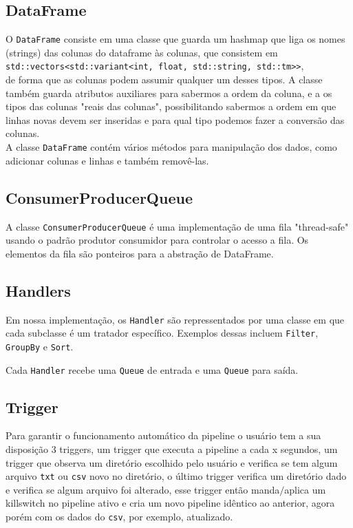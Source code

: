 \documentclass[12pt,a4paper]{article}
\begin{document}
\subsection*{DataFrame}
O \verb|DataFrame| consiste em uma classe que guarda um hashmap que liga os nomes (strings) das colunas do dataframe às colunas, que consistem em \\\texttt{std::vectors<std::variant<int, float, std::string, std::tm>>},\\
de forma que as colunas podem assumir qualquer um desses tipos. A classe também guarda atributos auxiliares para sabermos a ordem da coluna, e a os tipos das colunas "reais das colunas", possibilitando sabermos a ordem em que linhas novas devem ser inseridas e para qual tipo podemos fazer a conversão das colunas.\\
A classe \verb|DataFrame| contém vários métodos para manipulação dos dados, como adicionar colunas e linhas e também removê-las.
\subsection*{ConsumerProducerQueue}
A classe \verb|ConsumerProducerQueue| é uma implementação de uma fila "thread-safe" usando o padrão produtor consumidor para controlar o acesso a fila. Os elementos da fila são ponteiros para a abstração de DataFrame.
\subsection*{Handlers}
Em nossa implementação, os \verb|Handler| são repressentados por uma classe em que cada subclasse é um tratador específico. Exemplos dessas incluem \verb|Filter|, \verb|GroupBy| e \verb|Sort|.

Cada \verb|Handler| recebe uma \verb|Queue| de entrada e uma \verb|Queue| para saída.

\subsection*{Trigger}
Para garantir o funcionamento automático da pipeline o usuário tem a sua disposição 3
triggers, um trigger que executa a pipeline a cada x segundos, um trigger que observa um 
diretório escolhido pelo usuário e verifica se tem algum arquivo \texttt{txt} ou \texttt{csv} novo no diretório, o último trigger verifica um diretório dado e verifica se algum arquivo foi alterado, esse trigger então manda$/$aplica um killswitch no pipeline ativo e cria um novo pipeline idêntico ao anterior, agora porém com os dados do \texttt{csv}, por exemplo, atualizado.
\end{document}
